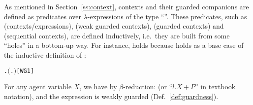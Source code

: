 As mentioned in
Section~\ref{ss:context}, \univariate contexts and their
guarded companions are defined as predicates over $\lambda$-expressions
of the type ``''. These predicates, such as
(contexts/expressions),  (weak guarded contexts),
 (guarded contexts) and  (sequential
contexts), are defined inductively, i.e.~they are built from some ``holes''
in a bottom-up way. For instance, 
holds because 
holds as a base case of the inductive definition of :
\begin{alltt}
\HOLTokenTurnstile{} \HOLSymConst{\HOLTokenForall{}}.  \ensuremath{(}\HOLTokenLambda{}. \HOLSymConst{\ensuremath{\ldotp}}\ensuremath{)}\hfill{[WG1]}
\end{alltt}
For any agent variable $X$, we have by $\beta$-reduction:
 (or ``$l.X + P$'' in textbook
notation), and the expression is weakly guarded (Def.~\ref{def:guardness}).

